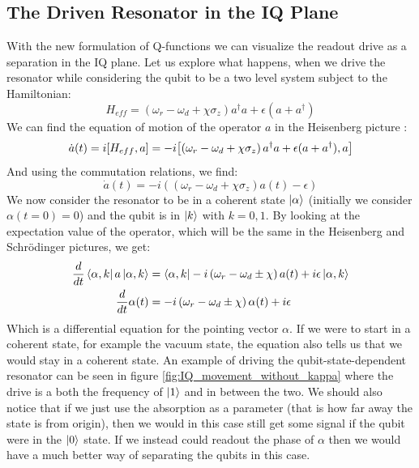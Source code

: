 \subsection{The Driven Resonator in the IQ Plane}\label{sec:driving_resonator_iq_plane}
With the new formulation of Q-functions we can visualize the readout drive as a separation in the IQ plane. Let us explore what happens, when we drive the resonator while considering the qubit to be a two level system subject to the Hamiltonian:
\begin{equation}
    H_{eff} =  \left(\omega_r - \omega_d + \chi \sigma_z\right)a^\dagger a +\epsilon(a + a^\dagger)
\end{equation}
We can find the equation of motion of the operator $a$ in the Heisenberg picture \cite{sakurai_modern_2021}:
\begin{equation}
    \dot{a}(t) = i\comm{H_{eff}}{a} = -i\comm{\left(\omega_r - \omega_d + \chi \sigma_z\right)a^\dagger a + \epsilon(a + a^\dagger)}{a}
\end{equation}
And using the commutation relations, we find:
\begin{equation}
    \dot{a}(t) = -i \left(\left(\omega_r - \omega_d + \chi \sigma_z\right) a(t) - \epsilon\right)
\end{equation}
We now consider the resonator to be in a coherent state $\ket{\alpha}$ (initially we consider $\alpha(t=0) = 0$) and the qubit is in $\ket{k}$ with $k = 0,  1$. By looking at the expectation value of the operator, which will be the same in the Heisenberg and Schrödinger pictures, we get: %
\begin{align}
    \dfrac{d}{dt} \bra{\alpha, k} a \ket{\alpha, k} &= \bra{\alpha, k}- i  \left(\omega_r - \omega_d \pm \chi \right) a(t) + i\epsilon\ket{\alpha, k} \nonumber \\
    \dfrac{d}{dt} \alpha(t) &= - i  \left(\omega_r - \omega_d \pm \chi \right) \alpha(t) + i\epsilon \label{eq:resonator_movement}
\end{align}
Which is a differential equation for the pointing vector $\alpha$. If we were to start in a coherent state, for example the vacuum state, the equation also tells us that we would stay in a coherent state. An example of driving the qubit-state-dependent resonator can be seen in figure \ref{fig:IQ_movement_without_kappa} where the drive is a both the frequency of $\ket{1}$ and in between the two. We should also notice that if we just use the absorption as a parameter (that is how far away the state is from origin), then we would in this case still get some signal if the qubit were in the $\ket{0}$ state. If we instead could readout the phase of $\alpha$ then we would have a much better way of separating the qubits in this case.


